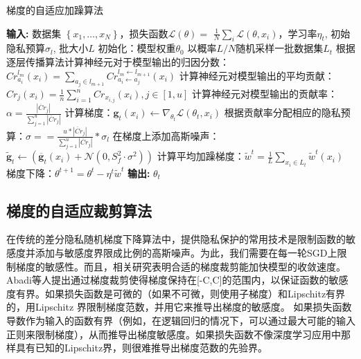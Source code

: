\begin{algorithm}[!htb]
	\caption{梯度的自适应加躁算法}
	\label{梯度的自适应加躁算法}
	\begin{algorithmic}[1]
		\footnotesize
		\STATE \textbf{输入:} 数据集 $\left\{x_{1}, \ldots, x_{N}\right\}$，损失函数$\mathcal{L}(\theta)=$ $\frac{1}{N} \sum_{i} \mathcal{L}\left(\theta, x_{i}\right)$，学习率$\eta_{t}$, 初始隐私预算$\sigma_{l}$, 批大小$L$
		\STATE 初始化：模型权重$\theta_{0}$
			\STATE 以概率$L / N$随机采样一批数据集$L_{t}$
				\STATE 根据逐层传播算法计算神经元对于模型输出的归因分数：$Cr_{a_{i}}^{l_{m}}\left(x_{i}\right)=\sum_{a_{j} \in l_{m+1}} Cr_{a_{i} \leftarrow a_{j}}^{l_{m} \leftarrow l_{m+1}}\left(x_{i}\right)$
				\STATE 计算神经元对模型输出的平均贡献：$Cr_{j}\left(x_{i}\right)=\frac{1}{n} \sum_{i=1}^{n} Cr_{x_{i, j}}\left(x_{i}\right), j \in[1, u]$
				\STATE 计算神经元对模型输出的贡献率：$\alpha=\frac{\left|\ddot{Cr}_{j}\right|}{\sum_{j=1}^{u}\left|\ddot{Cr}_{j}\right|}$
				\STATE 计算梯度：$\mathbf{g}_{t}\left(x_{i}\right) \leftarrow \nabla_{\theta_{t}} \mathcal{L}\left(\theta_{t}, x_{i}\right)$
				\STATE 根据贡献率分配相应的隐私预算：$\sigma==\frac{u *\left|\ddot{Cr}_{j}\right|}{\sum_{j=1}^{u}\left|\ddot{Cr}_{j}\right|} * \sigma_{l}$
				\STATE 在梯度上添加高斯噪声：$\tilde{\mathbf{g}}_{t} \leftarrow \left(\overline{\mathbf{g}}_{t}\left(x_{i}\right)+\mathcal{N}\left(0, S_{f}^{2} \cdot \sigma^{2}\right)\right)$
			\ENDFOR
			\STATE 计算平均加躁梯度：$\tilde{w}^{t}=\frac{1}{L} \sum_{x_{i} \in L_{t}} \tilde{w}^{t}(x_{i})$
			\STATE 梯度下降：$\theta^{t+1}=\theta^{t}-\eta^{t} \tilde{w}^{t}$
		\ENDFOR
		\STATE \textbf{输出:} $\theta_{t}$
	\end{algorithmic}
\end{algorithm}

\subsection{梯度的自适应裁剪算法}
在传统的差分隐私随机梯度下降算法中，提供隐私保护的常用技术是限制函数的敏感度并添加与敏感度界限成比例的高斯噪声。为此，我们需要在每一轮SGD上限制梯度的敏感性。而且，相关研究表明合适的梯度裁剪能加快模型的收敛速度。Abadi等人提出通过梯度裁剪使得梯度保持在[-C,C]的范围内，以保证函数的敏感度有界。如果损失函数是可微的（如果不可微，则使用子梯度）和Lipschitz有界的，用Lipschitz 界限制梯度范数，并用它来推导出梯度的敏感度。 如果损失函数导数作为输入的函数有界（例如，在逻辑回归的情况下，可以通过最大可能的输入正则来限制梯度），从而推导出梯度敏感度。如果损失函数不像深度学习应用中那样具有已知的Lipschitz界，则很难推导出梯度范数的先验界。

